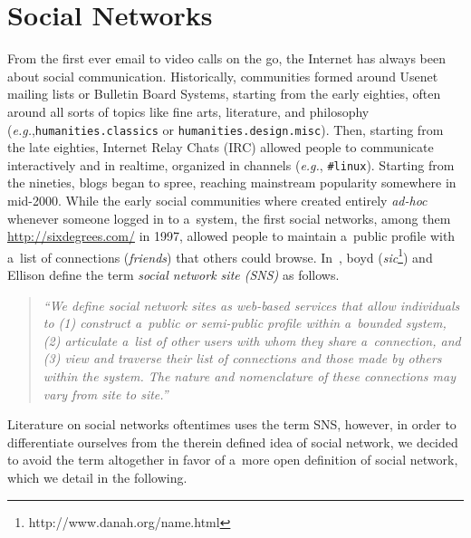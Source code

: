 \chapter{Social Networks} \label{cha:social-networks}

\ifpdf
    \graphicspath{{3_social_networks/figures/PNG/}{3_social_networks/figures/PDF/}{3_social_networks/figures/}}
\else
    \graphicspath{{3_social_networks/figures/EPS/}{3_social_networks/figures/}}
\fi

From the first ever email to video calls on the go,
the Internet has always been about social communication.
Historically, communities formed around Usenet mailing lists or Bulletin Board Systems, starting from the early eighties,
often around all sorts of topics like fine arts,
literature, and philosophy (\emph{e.g.},\texttt{humanities.classics}
or \texttt{humanities.\-design.misc}).
Then, starting from the late eighties, Internet Relay Chats (IRC)
allowed people to communicate interactively and in realtime,
organized in channels (\emph{e.g.}, \texttt{\#linux}).
Starting from the nineties, blogs began to spree,
reaching mainstream popularity somewhere in mid-2000.
While the early social communities
where created entirely \emph{ad-hoc}
whenever someone logged in to a~system,
the first social networks,
among them \url{http://sixdegrees.com/} in 1997,
allowed people to maintain a~public profile
with a~list of connections (\emph{friends})
that others could browse.
In~\cite{boyd2007socialnetworksites}, boyd
(\emph{sic}\footnote{http://www.danah.org/name.html})
and Ellison define the term
\emph{social network site (SNS)} as follows.

\begin{quotation}
  \textit{``We define social network sites as web-based services
  that allow individuals to
  (1) construct a~public or
  semi-public profile within a~bounded system,
  (2) articulate a~list of other users
  with whom they share a~connection, and
  (3) view and traverse their list of connections
  and those made by others within the system.
  The nature and nomenclature of these connections
  may vary from site to site.''}
\end{quotation}

Literature on social networks oftentimes uses the term SNS,
however, in order to differentiate ourselves
from the therein defined idea of social network,
we decided to avoid the term altogether in favor of a~more open
definition of social network,
which we detail in the following. 

